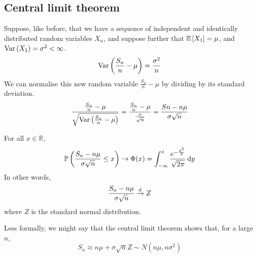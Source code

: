 \subsection{Central limit theorem}
Suppose, like before, that we have a sequence of independent and identically distributed random variables \(X_n\), and suppose further that \(\mathbb{E}\left[{X_1}\right] = \mu\), and \(\operatorname{Var}\left({X_1}\right) = \sigma^2 < \infty\).
\[
	\operatorname{Var}\left({\frac{S_n}{n} - \mu}\right) = \frac{\sigma^2}{n}
\]
We can normalise this new random variable \(\frac{S_n}{n} - \mu\) by dividing by its standard deviation.
\[
	\frac{\frac{S_n}{n} - \mu}{\sqrt{\operatorname{Var}\left({\frac{S_n}{n} - \mu}\right)}} = \frac{\frac{S_n}{n} - \mu}{\frac{\sigma}{\sqrt{n}}} = \frac{Sn - n\mu}{\sigma \sqrt{n}}
\]
\begin{theorem}
	For all \(x \in \mathbb R\),
	\[
		\mathbb{P}\left({\frac{S_n - n\mu}{\sigma \sqrt{n}} \leq x}\right) \to \Phi(x) = \int_{-\infty}^x \frac{e^{-\frac{y^2}{2}}}{\sqrt{2\pi}} \dd{y}
	\]
	In other words,
	\[
		\frac{S_n - n\mu}{\sigma \sqrt{n}} \xrightarrow{d} Z
	\]
	where \(Z\) is the standard normal distribution.
\end{theorem}
\noindent Less formally, we might say that the central limit theorem shows that, for a large \(n\),
\[
	S_n \approx n\mu + \sigma\sqrt{n}Z \sim N(n\mu, n\sigma^2)
\]
